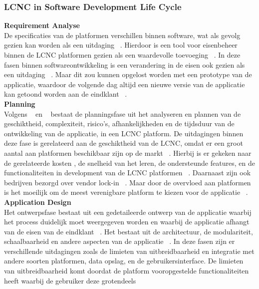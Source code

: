 \subsubsection*{LCNC in Software Development Life Cycle}
\label{subsec:lcnc-binnen-agile}
\textbf{Requirement Analyse}
\\
De specificaties van de platformen verschillen binnen software, wat als gevolg gezien kan worden als een uitdaging ~\autocite{Rokis_2022}. 
Hierdoor is een tool voor eisenbeheer binnen de LCNC platformen gezien als een waardevolle toevoeging ~\autocite{Rokis_2022}. 
In deze fasen binnen softwareontwikkeling is een verandering in de eisen ook gezien als een uitdaging ~\autocite{Rokis_2022}. 
Maar dit zou kunnen opgelost worden met een prototype van de applicatie, 
waardoor de volgende dag altijd een nieuwe versie van de applicatie kan getoond worden aan de eindklant ~\autocite{Rokis_2022}.
\\
\textbf{Planning}
\\
Volgens ~\textcite{Rokis_2022} en ~\textcite{Ghumatkar_2023}  bestaat de planningsfase uit het analyseren en plannen van de geschiktheid, complexiteit, risico's, afhankelijkheden en 
de tijdsduur van de ontwikkeling van de applicatie, in een LCNC platform. De uitdagingen binnen deze fase is gerelateerd aan de geschiktheid van de LCNC, 
omdat er een groot aantal aan platformen beschikbaar zijn op de markt ~\autocite{Rokis_2022}. Hierbij is er gekeken naar de gerelateerde kosten , de 
snelheid van het leren, de ondersteunde features, en de functionaliteiten in development van de LCNC platformen ~\autocite{Rokis_2022}. 
Daarnaast zijn ook bedrijven bezorgd over vendor lock-in ~\autocite{Rokis_2022}. Maar door de overvloed aan platformen is het moeilijk om 
de meest verenigbare platform te kiezen voor de applicatie ~\autocite{Rokis_2022}.
\\
\textbf{Application Design}
\\
Het ontwerpsfase bestaat uit een gedetaileerde ontwerp van de applicatie waarbij het process duidelijk moet weergegeven worden en waarbij de applicatie afhangt van de eisen van de eindklant ~\autocite{Ghumatkar_2023}. 
Het bestaat uit de architectuur, de modulariteit, schaalbaarheid en andere aspecten van de applicatie ~\autocite{Rokis_2022}. 
In deze fasen zijn er verschillende uitdagingen zoals de limieten van uitbreidbaarheid en integratie met andere soorten platformen, data opslag, en de gebruikersinterface. De limieten van uitbreidbaarheid komt doordat de platform vooropgestelde functionaliteiten heeft waarbij de gebruiker deze grotendeels 
